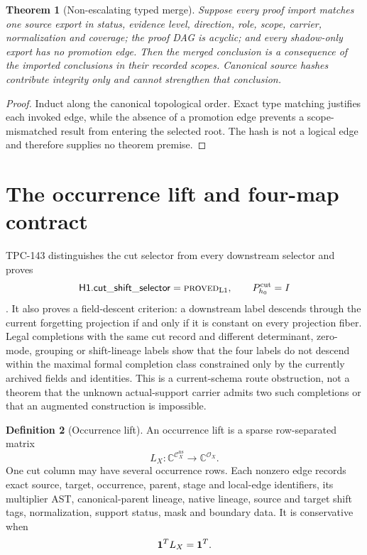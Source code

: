 \documentclass[11pt]{article}
\newtheorem{theorem}{Theorem}[section]
\theoremstyle{definition}
\newtheorem{definition}[theorem]{Definition}
\theoremstyle{remark}
\newcommand{\Lone}{\mathrm{L1}}
\newcommand{\PROVED}{\textnormal{\textsc{proved}}}
\newcommand{\Cns}{\mathcal C_X^{\mathrm{ns}}}
\newcommand{\Occ}{\mathcal O_X}
\begin{document}
\begin{theorem}[Non-escalating typed merge]
\label{thm:merge}
Suppose every proof import matches one source export in status,
evidence level, direction, role, scope, carrier, normalization and
coverage; the proof DAG is acyclic; and every shadow-only export has
no promotion edge.  Then the merged conclusion is a consequence of
the imported conclusions in their recorded scopes.  Canonical source
hashes contribute integrity only and cannot strengthen that
conclusion.
\end{theorem}

\begin{proof}
Induct along the canonical topological order.  Exact type matching
justifies each invoked edge, while the absence of a promotion edge
prevents a scope-mismatched result from entering the selected root.
The hash is not a logical edge and therefore supplies no theorem
premise.
\end{proof}

\section{The occurrence lift and four-map contract}

TPC-143 distinguishes the cut selector from every downstream
selector and proves
\[
 \mathsf{H1.cut\_shift\_selector}=\PROVED_{\Lone},
 \qquad P_{h_0}^{\rm cut}=I
\]
\citep{WangTPC143}.  It also proves a field-descent criterion: a
downstream label descends through the current forgetting projection
if and only if it is constant on every projection fiber.  Legal
completions with the same cut record and different determinant,
zero-mode, grouping or shift-lineage labels show that the four
labels do not descend within the maximal formal completion class
constrained only by the currently archived fields and identities.
This is a current-schema route obstruction, not a theorem that the
unknown actual-support carrier admits two such completions or that an
augmented construction is impossible.

\begin{definition}[Occurrence lift]
An occurrence lift is a sparse row-separated matrix
\[
 L_X:\mathbb C^{\Cns}\longrightarrow\mathbb C^{\Occ}.
\]
One cut column may have several occurrence rows.  Each nonzero edge
records exact source, target, occurrence, parent, stage and local-edge
identifiers, its multiplier AST, canonical-parent lineage, native
lineage, source and target shift tags, normalization, support status,
mask and boundary data.  It is conservative when
\[
 {\bf 1}^{T}L_X={\bf 1}^{T}.
\]
\end{definition}
\end{document}
